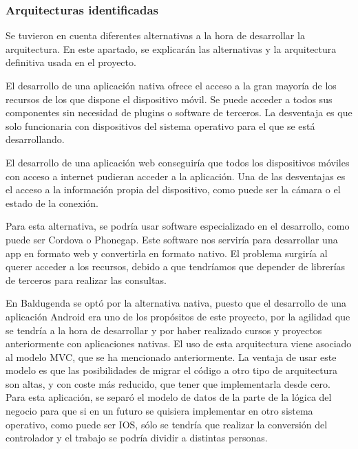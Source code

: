 \subsubsection{Arquitecturas identificadas}
\label{subsubsecc:Arquitecturas identificadas}

Se tuvieron en cuenta diferentes alternativas a la hora de desarrollar la arquitectura. En este apartado, se explicarán las alternativas y la arquitectura definitiva usada en el proyecto.


El desarrollo de una aplicación nativa ofrece el acceso a la gran mayoría de los recursos de los que dispone el dispositivo móvil.
Se puede acceder a todos sus componentes sin necesidad de plugins o software de terceros.
La desventaja es que solo funcionaria con dispositivos del sistema operativo para el que se está desarrollando.


El desarrollo de una aplicación web conseguiría que todos los dispositivos móviles con acceso a internet pudieran acceder a la aplicación.
Una de las desventajas es el acceso a la información propia del dispositivo, como puede ser la cámara o el estado de la conexión.

Para esta alternativa, se podría usar software especializado en el desarrollo, como puede ser Cordova\cite{Cordova} o Phonegap\cite{Phonegap}. Este software nos serviría para desarrollar una app en formato web y convertirla en formato nativo.
El problema surgiría al querer acceder a los recursos, debido a que tendríamos que depender de librerías de terceros para realizar las consultas.

En Baldugenda se optó por la alternativa nativa, puesto que el desarrollo de una aplicación Android era uno de los propósitos de este proyecto, por la agilidad que se tendría a la hora de desarrollar y por haber realizado cursos  y proyectos anteriormente con aplicaciones nativas.
El uso de esta arquitectura viene asociado al modelo MVC, que se ha mencionado anteriormente.  La ventaja de usar este modelo es que las posibilidades de migrar el código a otro tipo de arquitectura son altas, y con coste más reducido, que tener que implementarla desde cero.
Para esta aplicación, se separó el modelo de datos de la parte de la lógica del negocio para que si en un futuro se quisiera implementar en otro sistema operativo, como puede ser IOS, sólo se tendría que realizar la conversión del controlador y el trabajo se podría dividir a distintas personas.

